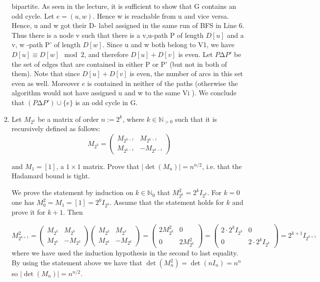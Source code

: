 \documentclass[11pt]{article}
\newcommand{\setN}{\mathbb{N}}
\begin{document}
\begin{enumerate}[1)]
\begin{solution}
bipartite. As seen in the lecture, it is sufficient to show that G contains an odd cycle.
Let $e = (u, w )$. Hence w is reachable from u and vice versa. Hence, u and w got their D-
label assigned in the same run of BFS in Line 6. Thus there is a node v such that there is a
v,u-path P of length $D[u]$ and a v, w -path P' of length $D[w ]$. Since u and w both belong to
V1, we have $D[u] ≡ D[w ] \mod 2$, and therefore $D[u] + D[v]$ is even. Let $P ∆P'$ be the set of
edges that are contained in either P or P' (but not in both of them). Note that since $D[u] +
D[v]$ is even, the number of arcs in this set even as well. Moreover $e$ is contained in neither
of the paths (otherwise the algorithm would not have assigned u and w to the same Vi ).
We conclude that $(P ∆P') ∪ \{e\}$ is an odd cycle in G.

\end{solution}


\item Let $M_{2^k}$ be a matrix of order $n:= 2^k$, where $k∈\setN_{>0}$ such that it is recursively defined as follows:
$$M_{2^k} = \begin{pmatrix} M_{2^{k−1}} &  M_{2^{k−1}} \\ M_{2^{k−1}} & −M_{2^{k−1}} \end{pmatrix} $$

and $M_1 = [1]$, a $1 \times 1$ matrix. Prove that $|\det(M_n)|= n^{n/2}$, i.e. that the Hadamard bound is tight.

\begin{solution}
We prove the statement by induction on $k∈\setN_0$ that $M^2_{2^k} = 2^kI_{2^k}$. For $k= 0$ one has $M^2_0 = M_1 =[1] = 2^0I_{2^0}$. Assume that the statement holds for $k$ and prove it for $k+ 1$. Then 


$$M^2_{2^{k+1}} = \begin{pmatrix} M_{2^{k}} &  M_{2^{k}} \\ M_{2^{k}} & −M_{2^{k}} \end{pmatrix} \begin{pmatrix} M_{2^{k}} &  M_{2^{k}} \\ M_{2^{k}} & −M_{2^{k}} \end{pmatrix} = \begin{pmatrix} 2M^2_{2^k} & 0  \\ 0 & 2M^2_{2^k} \end{pmatrix} = \begin{pmatrix} 2\cdot 2^k I_{2^k} & 0  \\ 0 & 2\cdot 2^k I_{2^k} \end{pmatrix} = 2^{k+1}I_{2^{k+1}}$$
where we have used the induction hypothesis in the second to last equality.
By using the statement above we have that $\det(M^2_n) = \det(n I_n) = n^n$ so $|\det(M_n)|= n^{n/2}.$
\end{solution}



\end{enumerate}
\end{document}
